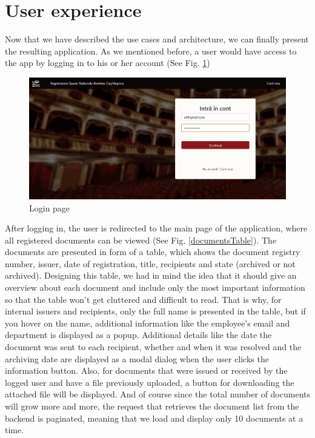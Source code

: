 \section{User experience}
\label{section:userExperience}

Now that we have described the use cases and architecture, we can finally present the resulting application. As we mentioned before, a user would have access to the app by logging in to his or her account (See Fig. \ref{login})

\begin{figure}[ht]
    \centering
    \includegraphics[width=5.5in]{images/app/login_filled}
    \caption{Login page}
    \label{login}
\end{figure}

After logging in, the user is redirected to the main page of the application, where all registered documents can be viewed (See Fig. \ref{documentsTable}). The documents are presented in form of a table, which shows the document registry number, issuer, date of registration, title, recipients and state (archived or not archived). Designing this table, we had in mind the idea that it should give an overview about each document and include only the most important information so that the table won't get cluttered and difficult to read. That is why, for internal issuers and recipients, only the full name is presented in the table, but if you hover on the name, additional information like the employee's email and department is displayed as a popup. Additional details like the date the document was sent to each recipient, whether and when it was resolved and the archiving date are displayed as a modal dialog when the user clicks the information button. Also, for documents that were issued or received by the logged user and have a file previously uploaded, a button for downloading the attached file will be displayed. And of course since the total number of documents will grow more and more, the request that retrieves the document list from the backend is paginated, meaning that we load and display only 10 documents at a time.

